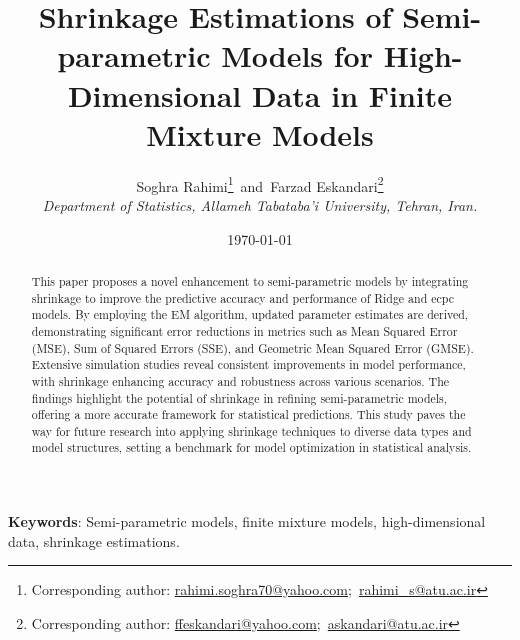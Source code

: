 \begin{small}
\title{\bf \Large   Shrinkage Estimations of Semi-parametric Models for High-Dimensional Data in Finite Mixture Models}


\author{Soghra Rahimi\footnote{Corresponding author: \url{rahimi.soghra70@yahoo.com};~\url{rahimi_s@atu.ac.ir}}~and~Farzad Eskandari\footnote{Corresponding author: \url{ffeskandari@yahoo.com};~\url{askandari@atu.ac.ir}}\\
{\it  Department of Statistics, Allameh Tabataba'i University, Tehran, Iran. }}
\date\today
\maketitle
\begin{abstract}	
\qquad This paper proposes a novel enhancement to semi-parametric models by integrating shrinkage to improve the predictive accuracy and performance of Ridge and ecpc models. By employing the EM algorithm, updated parameter estimates are derived, demonstrating significant error reductions in metrics such as Mean Squared Error (MSE), Sum of Squared Errors (SSE), and Geometric Mean Squared Error (GMSE). Extensive simulation studies reveal consistent improvements in model performance, with shrinkage enhancing accuracy and robustness across various scenarios. The findings highlight the potential of shrinkage in refining semi-parametric models, offering a more accurate framework for statistical predictions. This study paves the way for future research into applying shrinkage techniques to diverse data types and model structures, setting a benchmark for model optimization in statistical analysis.
\end{abstract}
\end {small}

{\bf Keywords}: Semi-parametric models, finite mixture models, high-dimensional data, shrinkage estimations.

%
%

